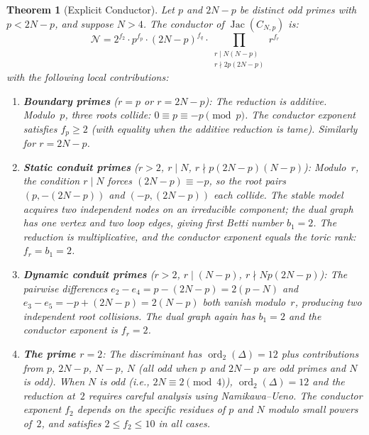 \documentclass[11pt,a4paper]{article}
\newtheorem{theorem}{Theorem}[section]
\theoremstyle{definition}
\DeclareMathOperator{\ord}{ord}
\DeclareMathOperator{\Jac}{Jac}
\begin{document}
\begin{theorem}[Explicit Conductor]\label{thm:conductor}
Let $p$ and $2N-p$ be distinct odd primes with $p < 2N-p$, and suppose $N > 4$. The conductor of $\Jac(C_{N,p})$ is:
$$\mathcal{N} = 2^{f_2} \cdot p^{f_p} \cdot (2N-p)^{f_q} \cdot \prod_{\substack{r \mid N(N-p) \\ r \nmid 2p(2N-p)}} r^{f_r}$$
with the following local contributions:
\begin{enumerate}
    \item[\textup{(i)}] \textbf{Boundary primes} ($r = p$ or $r = 2N-p$): The reduction is additive. Modulo~$p$, three roots collide: $0 \equiv p \equiv -p \pmod{p}$. The conductor exponent satisfies $f_p \ge 2$ \textup{(}with equality when the additive reduction is tame\textup{)}. Similarly for $r = 2N-p$.

    \item[\textup{(ii)}] \textbf{Static conduit primes} ($r > 2$, $r \mid N$, $r \nmid p(2N-p)(N-p)$): Modulo~$r$, the condition $r \mid N$ forces $(2N-p) \equiv -p$, so the root pairs $(p, -(2N-p))$ and $(-p, (2N-p))$ each collide. The stable model acquires two independent nodes on an irreducible component; the dual graph has one vertex and two loop edges, giving first Betti number $b_1 = 2$. The reduction is multiplicative, and the conductor exponent equals the toric rank: $f_r = b_1 = 2$.

    \item[\textup{(iii)}] \textbf{Dynamic conduit primes} ($r > 2$, $r \mid (N-p)$, $r \nmid Np(2N-p)$): The pairwise differences $e_2 - e_4 = p - (2N-p) = 2(p-N)$ and $e_3 - e_5 = -p + (2N-p) = 2(N-p)$ both vanish modulo~$r$, producing two independent root collisions. The dual graph again has $b_1 = 2$ and the conductor exponent is $f_r = 2$.

    \item[\textup{(iv)}] \textbf{The prime $r = 2$}: The discriminant has $\ord_2(\Delta) = 12$ plus contributions from $p$, $2N-p$, $N-p$, $N$ \textup{(}all odd when $p$ and $2N-p$ are odd primes and $N$ is odd\textup{)}. When $N$ is odd \textup{(}i.e., $2N \equiv 2 \pmod{4}$\textup{)}, $\ord_2(\Delta) = 12$ and the reduction at~$2$ requires careful analysis using Namikawa--Ueno. The conductor exponent $f_2$ depends on the specific residues of $p$ and $N$ modulo small powers of~$2$, and satisfies $2 \le f_2 \le 10$ in all cases.
\end{enumerate}
\end{theorem}
\end{document}
